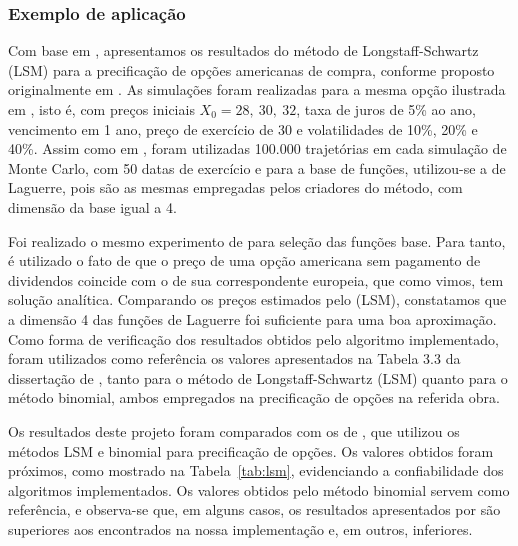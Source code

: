 \documentclass[12pt,openright,oneside,a4paper]{abntex2}
\numberwithin{equation}{section}
\begin{document}
\subsubsection{Exemplo de aplicação}
Com base em \textcite{silva2012}, apresentamos os resultados do método de Longstaff-Schwartz (LSM) para a precificação de opções americanas de compra, conforme proposto originalmente em \textcite{longstaff2001valuing}. As simulações foram realizadas para a mesma opção ilustrada em \textcite[seção 3.2.3]{silva2012}, isto é, com preços iniciais \(X_0 = 28,\ 30,\ 32\), taxa de juros de 5\% ao ano, vencimento em 1 ano, preço de exercício de 30 e volatilidades de 10\%, 20\% e 40\%. Assim como em \textcite{silva2012}, foram  utilizadas 100.000 trajetórias em cada simulação de Monte Carlo, com 50 datas de exercício e para a base de funções, utilizou-se a de Laguerre, pois são as mesmas empregadas pelos criadores do método, com dimensão da base igual a 4.

Foi realizado o mesmo experimento de \textcite[seção 3.2.3]{silva2012} para seleção das funções base. Para tanto,  é utilizado o fato de que o preço de uma opção americana sem pagamento de dividendos coincide com o de sua correspondente europeia, que como vimos, tem solução analítica. Comparando os preços estimados pelo (LSM),  constatamos que a dimensão 4 das funções de Laguerre foi suficiente para uma boa aproximação. 
Como forma de verificação dos resultados obtidos pelo algoritmo implementado, foram utilizados como referência os valores apresentados na Tabela 3.3 da dissertação de \textcite{silva2012}, tanto para o método de Longstaff-Schwartz (LSM) quanto para o método binomial, ambos empregados na precificação de opções na referida obra. %

Os resultados deste projeto foram comparados com os de \textcite[seção 3.2.3]{silva2012}, que utilizou os métodos LSM e binomial para precificação de opções. Os valores obtidos foram próximos, como mostrado na Tabela~\ref{tab:lsm}, evidenciando a confiabilidade dos algoritmos implementados. Os valores obtidos pelo método binomial servem como referência, e observa-se que, em alguns casos, os resultados apresentados por \textcite[seção 3.2.3]{silva2012} são superiores aos encontrados na nossa implementação e, em outros, inferiores.
\end{document}
